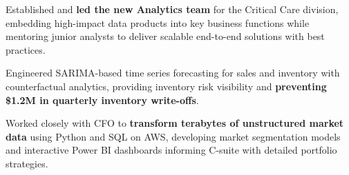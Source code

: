 \documentclass[letterpaper,11pt]{article}
\newcommand{\resumeItem}[1]{
  \item{\small{#1}}
}
\begin{document}






    \resumeItem{Established and \textbf{led the new Analytics team} for the Critical Care division, embedding high-impact data products into key business functions while mentoring junior analysts to deliver scalable end-to-end solutions with best practices.}


    \resumeItem{Engineered SARIMA-based time series forecasting for sales and inventory with counterfactual analytics, providing inventory risk visibility and \textbf{preventing \$1.2M in quarterly inventory write-offs}.}

   \resumeItem{Worked closely with CFO to \textbf{transform terabytes of unstructured market data} using Python and SQL on AWS, developing market segmentation models and interactive Power BI dashboards informing C-suite with detailed portfolio strategies.}

    
\end{document}
